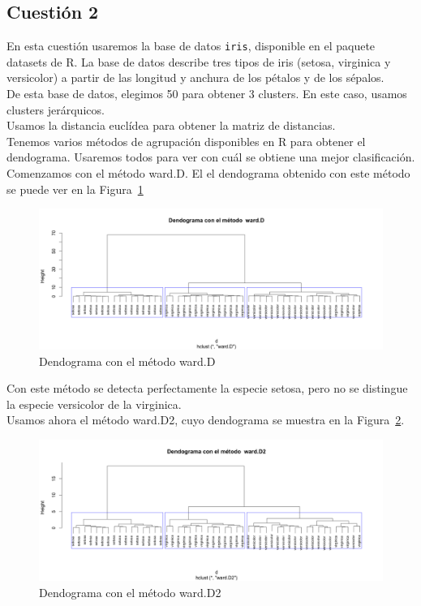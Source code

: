 \documentclass[12pt,a4paper,twoside,openright,titlepage,final]{article}
\begin{document}
\subsection{Cuestión 2}

En esta cuestión usaremos la base de datos \texttt{iris}, disponible en el paquete datasets de R. La base de datos describe tres tipos de iris (setosa, virginica y versicolor) a partir de las longitud y anchura de los pétalos y de los sépalos.\\

De esta base de datos, elegimos 50 para obtener 3 clusters. En este caso, usamos clusters jerárquicos.\\

Usamos la distancia euclídea para obtener la matriz de distancias.\\

Tenemos varios métodos de agrupación disponibles en R para obtener el dendograma. Usaremos todos para ver con cuál se obtiene una mejor clasificación.\\

Comenzamos con el método ward.D. El el dendograma obtenido con este método se puede ver en la Figura~\ref{fig:dendograma_ward.D}\\

\begin{figure}[tbph!]
\centering
\includegraphics[width=0.9\linewidth]{imagenes/dendograma_wardD}
\caption{Dendograma con el método ward.D}
\label{fig:dendograma_ward.D}
\end{figure}

Con este método se detecta perfectamente la especie setosa, pero no se distingue la especie versicolor de la virginica.\\

Usamos ahora el método ward.D2, cuyo dendograma se muestra en la Figura~\ref{fig:dendograma_ward.D2}.\\

\begin{figure}[tbph!]
\centering
\includegraphics[width=0.9\linewidth]{imagenes/dendograma_wardD2}
\caption{Dendograma con el método ward.D2}
\label{fig:dendograma_ward.D2}
\end{figure}
\end{document}
